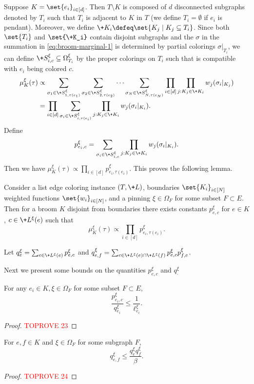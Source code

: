 \documentclass[a4paper,11pt]{article}
\begin{document}
Suppose $K = \set{e_i}_{i\in [d]}$.
Then $T\setminus K$ is composed of $d$ disconnected subgraphs denoted by $T_i$
such that $T_i$ is adjacent to $K$ in $T$ (we define $T_i = \emptyset$
if $e_i$ is pendant).
Moreover, we define $\+K_i\defeq\set{K_j\mid K_j\subseteq T_i}$.
Since both $\set{T_i}$ and $\set{\+K_i}$ contain disjoint subgraphs and 
the $\sigma$ in the summation in \cref{eq:broom-marginal-1}
is determined by partial colorings $\sigma|_{T_i}$,
we can define $\+S^\xi_{i, c}\subseteq \Omega^\xi_{T_i}$ by the proper colorings 
on $T_i$ such that is compatible with $e_i$ being colored $c$.
\begin{align*}
\mu^\xi_K(\tau)
&\propto
  \sum_{\sigma_1\in \+S^\xi_{1, \tau(e_1)}}
  \sum_{\sigma_2\in \+S^\xi_{2, \tau(e_2)}}\dots
  \sum_{\sigma_N\in \+S^\xi_{N, \tau(e_N)}}
  \prod_{i\in [d]} \prod_{j : K_j\in \+K_i} w_j(\sigma_i|_{K_j})\\
&= \prod_{i\in [d]} \sum_{\sigma_i\in \+S^\xi_{i, \tau(e_i)}}
     \prod_{j : K_j\in \+K_i} w_j(\sigma_i|_{K_i}).
\end{align*}
Define 
\[
p^\xi_{e_i,c}=\sum_{\sigma_i\in \+S^\xi_{i, c}}
     \prod_{j : K_j\in \+K_i} w_j(\sigma_i|_{K_i}).
\]
Then we have $\mu^\xi_K(\tau)\propto\prod_{i\in [d]} p^\xi_{e_i,\tau(e_i)}$.
This proves the following lemma.
\begin{lemma}
    Consider a list edge coloring instance $(T, \+L)$,
    boundaries $\set{K_i}_{i\in [N]}$
    weighted functions $\set{w_i}_{i\in [N]}$,
    and a pinning $\xi\in \Omega_{F}$ for some subset $F\subset E$.
    Then for a broom $K$ disjoint from boundaries
    there exists constants $p^\xi_{e, c}$ for $e\in K$, $c\in \+L^\xi(e)$ such that
    \[
    \mu^\xi_K(\tau)\propto\prod_{i\in [d]} p^\xi_{e_i,\tau(e_i)}.
    \]
\end{lemma}

Let $q^\xi_e=\sum_{c\in \+L^\xi(e)} p^\xi_{e,c}$
and $q^\xi_{e,f}=\sum_{c\in \+L^\xi(e)\cap \+L^\xi(f)} p^\xi_{e,c}p^\xi_{f,c}$.

Next we present some bounds on the quantities $p^\xi_{e, c}$ and $q^\xi_\cdot$
\begin{lemma}\label{lem:marginal-bound-weighted-1}
For any $e_i\in K, \xi\in \Omega_F$ for some subset $F \subset E$,
\[
\frac{p^\xi_{e_i,c}}{q^\xi_{e_i}}\le \frac{1}{\ell^\xi_{e_i}} .
\]
\end{lemma}
\begin{proof}\textcolor{red}{TOPROVE 23}\end{proof}
\begin{lemma}\label{lem:marginal-bound-weighted-2}
For $e,f\in K$ and $\xi\in \Omega_F$ for some subgraph $F$,
    \[
    q^\xi_{e,f}\leq \frac{q^\xi_e q^\xi_f}{\beta} .
    \]
\end{lemma}
\begin{proof}\textcolor{red}{TOPROVE 24}\end{proof}
\end{document}
